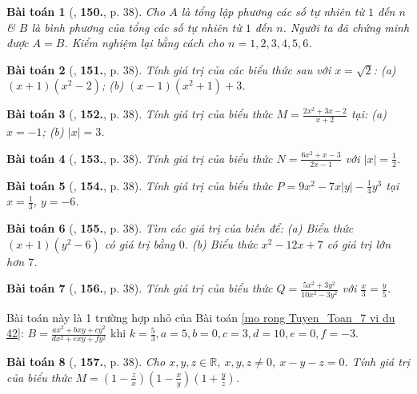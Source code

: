 \documentclass{article}
\numberwithin{equation}{section}
\newtheorem{baitoan}{Bài toán}
\begin{document}
\begin{baitoan}[\cite{Tuyen_Toan_7}, \textbf{150.}, p. 38]
	Cho $A$ là tổng lập phương các số tự nhiên từ $1$ đến $n$ \& $B$ là bình phương của tổng các số tự nhiên từ $1$ đến $n$. Người ta đã chứng minh được $A = B$. Kiểm nghiệm lại bằng cách cho $n = 1,2,3,4,5,6$.
\end{baitoan}

\begin{baitoan}[\cite{Tuyen_Toan_7}, \textbf{151.}, p. 38]
	Tính giá trị của các biểu thức sau với $x = \sqrt{2}$: (a) $(x + 1)(x^2 - 2)$; (b) $(x - 1)(x^2 + 1) + 3$.
\end{baitoan}

\begin{baitoan}[\cite{Tuyen_Toan_7}, \textbf{152.}, p. 38]
	Tính giá trị của biểu thức $M = \frac{2x^2 + 3x - 2}{x + 2}$ tại: (a) $x = -1$; (b) $|x| = 3$.
\end{baitoan}

\begin{baitoan}[\cite{Tuyen_Toan_7}, \textbf{153.}, p. 38]
	Tính giá trị của biểu thức $N = \frac{6x^2 + x - 3}{2x - 1}$ với $|x| = \frac{1}{2}$.
\end{baitoan}

\begin{baitoan}[\cite{Tuyen_Toan_7}, \textbf{154.}, p. 38]
	Tính giá trị của biểu thức $P = 9x^2 - 7x|y| - \frac{1}{4}y^3$ tại $x = \frac{1}{3}$, $y = -6$.
\end{baitoan}

\begin{baitoan}[\cite{Tuyen_Toan_7}, \textbf{155.}, p. 38]
	Tìm các giá trị của biến để: (a) Biểu thức $(x + 1)(y^2 - 6)$ có giá trị bằng $0$. (b) Biểu thức $x^2 - 12x + 7$ có giá trị lớn hơn $7$.
\end{baitoan}

\begin{baitoan}[\cite{Tuyen_Toan_7}, \textbf{156.}, p. 38]
	Tính giá trị của biểu thức $Q = \frac{5x^2 + 3y^2}{10x^2 - 3y^2}$ với $\frac{x}{3} = \frac{y}{5}$.
\end{baitoan}
Bài toán này là 1 trường hợp nhỏ của Bài toán \ref{mo rong Tuyen_Toan_7 vi du 42}: $B = \frac{ax^2 + bxy + cy^2}{dx^2 + exy + fy^2}$ khi $k = \frac{5}{3}, a = 5, b = 0, c = 3, d = 10, e = 0, f = -3$.

\begin{baitoan}[\cite{Tuyen_Toan_7}, \textbf{157.}, p. 38]
	Cho $x,y,z\in\mathbb{R}$, $x,y,z\ne0$, $x - y - z = 0$. Tính giá trị của biểu thức $M = \left(1 - \frac{z}{x}\right)\left(1 - \frac{x}{y}\right)\left(1 + \frac{y}{z}\right)$.
\end{baitoan}
\end{document}
